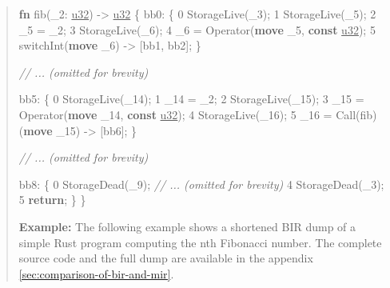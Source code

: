 \documentclass[
  11pt,
  twoside]{report}
\newenvironment{Shaded}{}{}
\newcommand{\CommentTok}[1]{\textit{#1}}
\newcommand{\ControlFlowTok}[1]{\textbf{#1}}
\newcommand{\DataTypeTok}[1]{\underline{#1}}
\newcommand{\DecValTok}[1]{#1}
\newcommand{\KeywordTok}[1]{\textbf{#1}}
\newcommand{\NormalTok}[1]{#1}
\newcommand{\OperatorTok}[1]{#1}
\begin{document}
\begin{quote}
\begin{Shaded}
\begin{Highlighting}[]
\KeywordTok{fn}\NormalTok{ fib(\_2}\OperatorTok{:} \DataTypeTok{u32}\NormalTok{) }\OperatorTok{{-}\textgreater{}} \DataTypeTok{u32} \OperatorTok{\{}
\NormalTok{    bb0}\OperatorTok{:} \OperatorTok{\{}
    \DecValTok{0}\NormalTok{    StorageLive(\_3)}\OperatorTok{;}
    \DecValTok{1}\NormalTok{    StorageLive(\_5)}\OperatorTok{;}
    \DecValTok{2}\NormalTok{    \_5 }\OperatorTok{=}\NormalTok{ \_2}\OperatorTok{;}
    \DecValTok{3}\NormalTok{    StorageLive(\_6)}\OperatorTok{;}
    \DecValTok{4}\NormalTok{    \_6 }\OperatorTok{=}\NormalTok{ Operator(}\KeywordTok{move}\NormalTok{ \_5}\OperatorTok{,} \KeywordTok{const} \DataTypeTok{u32}\NormalTok{)}\OperatorTok{;}
    \DecValTok{5}\NormalTok{    switchInt(}\KeywordTok{move}\NormalTok{ \_6) }\OperatorTok{{-}\textgreater{}}\NormalTok{ [bb1}\OperatorTok{,}\NormalTok{ bb2]}\OperatorTok{;}
    \OperatorTok{\}}

   \CommentTok{// ... (omitted for brevity) }

\NormalTok{    bb5}\OperatorTok{:} \OperatorTok{\{}
    \DecValTok{0}\NormalTok{    StorageLive(\_14)}\OperatorTok{;}
    \DecValTok{1}\NormalTok{    \_14 }\OperatorTok{=}\NormalTok{ \_2}\OperatorTok{;}
    \DecValTok{2}\NormalTok{    StorageLive(\_15)}\OperatorTok{;}
    \DecValTok{3}\NormalTok{    \_15 }\OperatorTok{=}\NormalTok{ Operator(}\KeywordTok{move}\NormalTok{ \_14}\OperatorTok{,} \KeywordTok{const} \DataTypeTok{u32}\NormalTok{)}\OperatorTok{;}
    \DecValTok{4}\NormalTok{    StorageLive(\_16)}\OperatorTok{;}
    \DecValTok{5}\NormalTok{    \_16 }\OperatorTok{=}\NormalTok{ Call(fib)(}\KeywordTok{move}\NormalTok{ \_15) }\OperatorTok{{-}\textgreater{}}\NormalTok{ [bb6]}\OperatorTok{;}
    \OperatorTok{\}}

    \CommentTok{// ... (omitted for brevity)}

\NormalTok{    bb8}\OperatorTok{:} \OperatorTok{\{}
    \DecValTok{0}\NormalTok{    StorageDead(\_9)}\OperatorTok{;}
    \CommentTok{// ... (omitted for brevity) }
    \DecValTok{4}\NormalTok{    StorageDead(\_3)}\OperatorTok{;}
    \DecValTok{5}    \ControlFlowTok{return}\OperatorTok{;}
    \OperatorTok{\}}
\OperatorTok{\}}
\end{Highlighting}
\end{Shaded}

\textbf{Example:} The following example shows a shortened BIR dump of a
simple Rust program computing the nth Fibonacci number. The complete
source code and the full dump are available in the appendix
\ref{sec:comparison-of-bir-and-mir}.
\end{quote}
\end{document}
